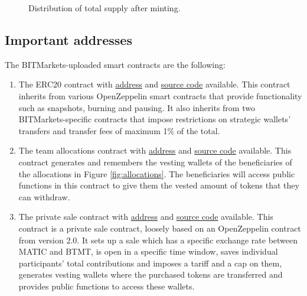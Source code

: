 \documentclass[a4paper,12pt]{article}
\begin{document}
\begin{figure}[h!]
\centering
{}
\caption{Distribution of total supply after minting.}
\end{figure}

\subsection{Important addresses}

The BITMarkets-uploaded smart contracts are the following:
\begin{enumerate}
  \item \label{contracts:token} The ERC20 contract with \href{https://mumbai.polygonscan.com/address/0x5D4f3495c35B5A6687095710Cb02154E975dd147}{address} and \href{https://github.com/UAB-BITmarkets/token/blob/master/contracts/BITMarketsToken.sol}{source code} available. This contract inherits from various OpenZeppelin smart contracts that provide functionality such as snapshots, burning and pausing. It also inherits from two BITMarkets-specific contracts that impose restrictions on strategic wallets' transfers and transfer fees of maximum 1\% of the total.

  \item \label{contracts:allocations} The team allocations contract with \href{https://mumbai.polygonscan.com/address/0x156233dcA50144cb5E3EA3fA14E20DD6fC70fB0C}{address} and \href{https://github.com/UAB-BITmarkets/token/blob/master/contracts/BITMarketsTokenAllocations.sol}{source code} available. This contract generates and remembers the vesting wallets of the beneficiaries of the allocations in Figure \ref{fig:allocations}. The beneficiaries will access public functions in this contract to give them the vested amount of tokens that they can withdraw.

  \item \label{contracts:privatesale} The private sale contract with \href{https://mumbai.polygonscan.com/address/0x82D1205305c01B5FC67a261EE63542c04D4d521d}{address} and \href{https://github.com/UAB-BITmarkets/token/blob/master/contracts/BITMarketsTokenPrivateSale.sol}{source code} available.
  This contract is a private sale contract, loosely based on an OpenZeppelin contract from version 2.0. It sets up a sale which has a specific exchange rate between MATIC and BTMT, is open in a specific time window, saves individual participants' total contributions and imposes a tariff and a cap on them, generates vesting wallets where the purchased tokens are transferred and provides public functions to access these wallets.

\end{enumerate}
\end{document}
